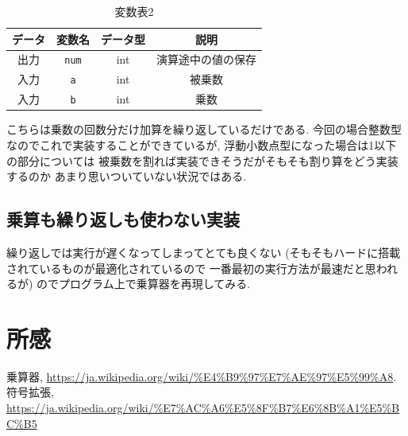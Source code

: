 \documentclass[a4paper, xelatex, ja=standard]{bxjsarticle}
\begin{document}
\begin{table}[h]
\centering
\caption{変数表2}
\label{}
\begin{tabular}{|c|c|c|c|}
\hline
データ & 変数名 & データ型 & 説明  \\ \hline
出力 & \texttt{num} & int  & 演算途中の値の保存 \\ \hline
入力 & \texttt{a} & int  & 被乗数 \\ \hline
入力 & \texttt{b} & int  & 乗数  \\ \hline
\end{tabular}
\end{table}
こちらは乗数の回数分だけ加算を繰り返しているだけである.
今回の場合整数型なのでこれで実装することができているが,
浮動小数点型になった場合は1以下の部分については
被乗数を割れば実装できそうだがそもそも割り算をどう実装するのか
あまり思いついていない状況ではある.

\subsection{乗算も繰り返しも使わない実装}
繰り返しでは実行が遅くなってしまってとても良くない
(そもそもハードに搭載されているものが最適化されているので
一番最初の実行方法が最速だと思われるが)
のでプログラム上で乗算器を再現してみる.



\section{所感}

\begin{thebibliography}{9}
 乗算器, \url{https://ja.wikipedia.org/wiki/%E4%B9%97%E7%AE%97%E5%99%A8}.
 符号拡張, \url{https://ja.wikipedia.org/wiki/%E7%AC%A6%E5%8F%B7%E6%8B%A1%E5%BC%B5}
\end{thebibliography}
\end{document}
